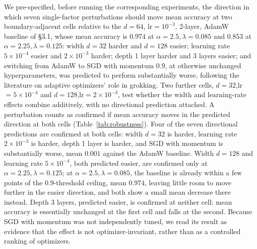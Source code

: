 \documentclass[11pt]{article}
\begin{document}
We pre-specified, before running the corresponding experiments, the direction in which seven single-factor perturbations should move mean accuracy at two boundary-adjacent cells relative to the $d{=}64$, lr$=10^{-3}$, 2-layer, AdamW baseline of \S3.1, whose mean accuracy is $0.974$ at $\alpha{=}2.5,\lambda{=}0.085$ and $0.853$ at $\alpha{=}2.25,\lambda{=}0.125$: width $d{=}32$ harder and $d{=}128$ easier; learning rate $5\times10^{-4}$ easier and $2\times10^{-3}$ harder; depth 1 layer harder and 3 layers easier; and switching from AdamW to SGD with momentum $0.9$, at otherwise unchanged hyperparameters, was predicted to perform substantially worse, following the literature on adaptive optimizers' role in grokking. Two further cells, $d{=}32$,lr$=5\times10^{-4}$ and $d{=}128$,lr$=2\times10^{-3}$, test whether the width and learning-rate effects combine additively, with no directional prediction attached. A perturbation counts as confirmed if mean accuracy moves in the predicted direction at both cells (Table~\ref{tab:robustness}). Four of the seven directional predictions are confirmed at both cells: width $d{=}32$ is harder, learning rate $2\times10^{-3}$ is harder, depth 1 layer is harder, and SGD with momentum is substantially worse, mean $0.001$ against the AdamW baseline. Width $d{=}128$ and learning rate $5\times10^{-4}$, both predicted easier, are confirmed only at $\alpha{=}2.25,\lambda{=}0.125$; at $\alpha{=}2.5,\lambda{=}0.085$, the baseline is already within a few points of the $0.9$-threshold ceiling, mean $0.974$, leaving little room to move further in the easier direction, and both show a small mean decrease there instead. Depth 3 layers, predicted easier, is confirmed at neither cell: mean accuracy is essentially unchanged at the first cell and falls at the second. Because SGD with momentum was not independently tuned, we read its result as evidence that the effect is not optimizer-invariant, rather than as a controlled ranking of optimizers.
\end{document}
